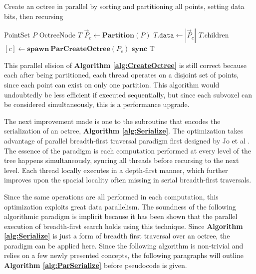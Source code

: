 \documentclass[twoside,twocolumn]{article}
\begin{document}
\begin{algorithm}[h]
\small
\caption{Create an octree in parallel by sorting and partitioning all points, setting data bits, then recursing}
\label{alg:ParCreateOctree}
\begin{algorithmic}[1]
 {PointSet $P$}
  \State OctreeNode $T$
  \State $\vec{P}_c \gets \textbf{Partition}(P)$
  \State $T.\mathtt{data} \gets |\vec{P}_c|$
    \State $T$.children$[c] \gets \mathbf{spawn \ ParCreateOctree}(P_c)$
  \EndFor
  \State $\mathbf{sync}$
  \State \Return T
  \EndProcedure
\Statex
\end{algorithmic}
  \vspace{-0.4cm}
\end{algorithm}

This parallel elision of \textbf{Algorithm \ref{alg:CreateOctree}} is still correct because each after
being partitioned, each thread operates on a disjoint set of points, since each point can exist on only
one partition. This algorithm would undoubtedly be less efficient if executed sequentially, but since
each subvoxel can be considered simultaneously, this is a performance upgrade.

The next improvement made is one to the subroutine that encodes the serialization of an octree,
\textbf{Algorithm \ref{alg:Serialize}}. The optimization takes advantage of parallel breadth-first
traversal paradigm first designed by Jo et al \cite{trees}. The essence of the paradigm is each
computation performed at every level of the tree happens simultaneously, syncing all threads before
recursing to the next level. Each thread locally executes in a depth-first manner, which further
improves upon the spacial locality often missing in serial breadth-first traversals.

Since the same operations are all performed in each computation, this optimization exploits great data
parallelism. The soundness of the following algorithmic paradigm is implicit because it has been shown
that the parallel execution of breadth-first search holds using this technique. Since
\textbf{Algorithm \ref{alg:Serialize}} is just a form of breadth first traversal over an octree,
the paradigm can be applied here. Since the following algorithm is non-trivial and relies on a few newly
presented concepts, the following paragraphs will outline \textbf{Algorithm \ref{alg:ParSerialize}} before
pseudocode is given.
\end{document}
